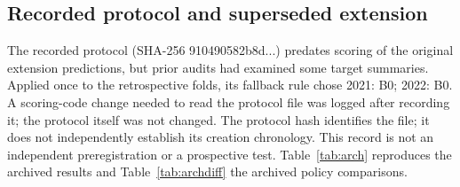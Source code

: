 \documentclass[preprint,12pt,authoryear]{elsarticle}
\begin{document}
\subsection{Recorded protocol and superseded extension}
The recorded protocol (SHA-256 910490582b8d...) predates scoring of the original extension predictions, but prior audits had examined some target summaries. Applied once to the retrospective folds, its fallback rule chose 2021: B0; 2022: B0. A scoring-code change needed to read the protocol file was logged after recording it; the protocol itself was not changed. The protocol hash identifies the file; it does not independently establish its creation chronology. This record is not an independent preregistration or a prospective test. Table~\ref{tab:arch} reproduces the archived results and Table~\ref{tab:archdiff} the archived policy comparisons.
\end{document}
